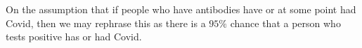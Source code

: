\documentclass[10pt]{fphw}
\begin{document}
\begin{enumerate}
    On the assumption that if people who have antibodies have or at some point had Covid, then we may rephrase this as there is a $95\%$ chance that
    a person who tests positive has or had Covid.
\end{enumerate}
\end{document}
